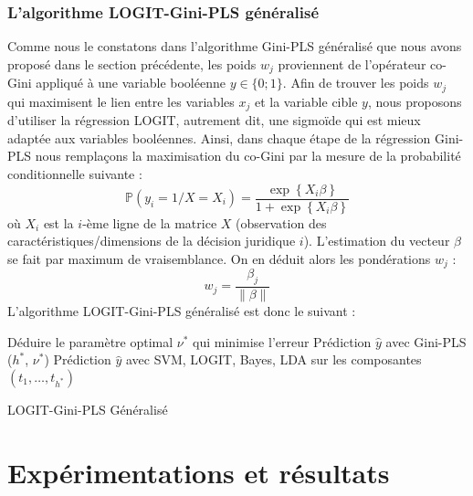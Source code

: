 \subsubsection{L'algorithme LOGIT-Gini-PLS généralisé} 
\label{sec:sensresultat:logit-gini-pls}
Comme nous le constatons dans l'algorithme Gini-PLS généralisé que nous avons proposé dans le section précédente, les poids $w_j$ proviennent de l'opérateur co-Gini appliqué à une variable booléenne $y \in \lbrace 0;1 \rbrace$. Afin de trouver les poids $w_j$ qui maximisent le lien entre les variables $x_j$ et la variable cible $y$, nous proposons d'utiliser la régression LOGIT, autrement dit, une sigmoïde qui est mieux adaptée aux variables booléennes. Ainsi, dans chaque étape de la régression Gini-PLS nous remplaçons la maximisation du co-Gini par la mesure de la probabilité conditionnelle suivante :
\begin{equation}\tag{LOGIT}
\mathbb{P}(y_i = 1 / X = X_i) = \frac{\exp\left\{X_i \beta \right\}}{1+\exp\left\{ X_i \beta \right\}}
\end{equation}
où $X_i$ est la $i$-ème ligne de la matrice $X$ (observation des caractéristiques/dimensions de la décision juridique $i$). L'estimation du vecteur $\beta$ se fait par maximum de vraisemblance. On en déduit alors les pondérations $w_j$ :
\[
w_j = \frac{\beta_j}{\| \beta\|}
\]
L'algorithme LOGIT-Gini-PLS généralisé est donc le suivant :

\begin{algorithm}[h]
	\small
	Déduire le paramètre optimal $\nu^*$ qui minimise l'erreur \; 
	\Return Prédiction $\hat{y}$ avec Gini-PLS ($h^*$, $\nu^*$) \;
	\Return Prédiction $\hat{y}$ avec SVM, LOGIT, Bayes, LDA sur les composantes $(t_1,\ldots,t_{h^*})$\;
	\caption{LOGIT-Gini-PLS Généralisé}\label{LG-GPLS}
\end{algorithm}

\section{Expérimentations et résultats}
\label{sec:sensresultat:experimentations}



